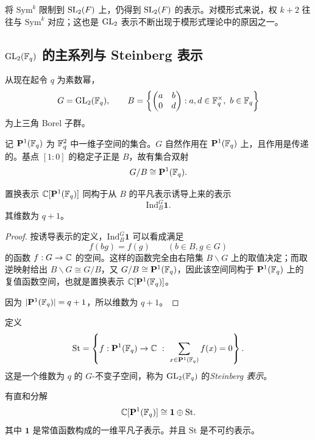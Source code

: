\begin{remark}
将 $\mathrm{Sym}^k$ 限制到 $\mathrm{SL}_2(F)$ 上，仍得到 $\mathrm{SL}_2(F)$ 的表示。对模形式来说，权 $k+2$ 往往与 $\mathrm{Sym}^k$ 对应；这也是 $\mathrm{GL}_2$ 表示不断出现于模形式理论中的原因之一。
\end{remark}

\subsection*{$\mathrm{GL}_2(\mathbb{F}_q)$ 的主系列与 Steinberg 表示}

从现在起令 $q$ 为素数幂，
\[
G=\mathrm{GL}_2(\mathbb{F}_q),
\qquad
B=\left\{\begin{pmatrix} a&b\\0&d \end{pmatrix}:a,d\in \mathbb{F}_q^{\times},\ b\in \mathbb{F}_q\right\}
\]
为上三角 Borel 子群。

记 $\mathbf{P}^1(\mathbb{F}_q)$ 为 $\mathbb{F}_q^2$ 中一维子空间的集合。$G$ 自然作用在 $\mathbf{P}^1(\mathbb{F}_q)$ 上，且作用是传递的。基点 $[1:0]$ 的稳定子正是 $B$，故有集合双射
\[
G/B\cong \mathbf{P}^1(\mathbb{F}_q).
\]

\begin{proposition}
置换表示 $\mathbb{C}[\mathbf{P}^1(\mathbb{F}_q)]$ 同构于从 $B$ 的平凡表示诱导上来的表示
\[
\mathrm{Ind}_B^G \mathbf{1}.
\]
其维数为 $q+1$。
\end{proposition}

\begin{proof}
按诱导表示的定义，$\mathrm{Ind}_B^G\mathbf{1}$ 可以看成满足
\[
 f(bg)=f(g)\qquad (b\in B,g\in G)
\]
的函数 $f:G\to \mathbb{C}$ 的空间。这样的函数完全由右陪集 $B\backslash G$ 上的取值决定；而取逆映射给出 $B\backslash G\cong G/B$，又 $G/B\cong \mathbf{P}^1(\mathbb{F}_q)$，因此该空间同构于 $\mathbf{P}^1(\mathbb{F}_q)$ 上的复值函数空间，也就是置换表示 $\mathbb{C}[\mathbf{P}^1(\mathbb{F}_q)]$。

因为 $|\mathbf{P}^1(\mathbb{F}_q)|=q+1$，所以维数为 $q+1$。
\end{proof}

\begin{definition}
定义
\[
\mathrm{St}=
\left\{f:\mathbf{P}^1(\mathbb{F}_q)\to \mathbb{C}\ :\ \sum_{x\in \mathbf{P}^1(\mathbb{F}_q)}f(x)=0\right\}.
\]
这是一个维数为 $q$ 的 $G$-不变子空间，称为 $\mathrm{GL}_2(\mathbb{F}_q)$ 的\emph{Steinberg 表示}。
\end{definition}

\begin{proposition}
有直和分解
\[
\mathbb{C}[\mathbf{P}^1(\mathbb{F}_q)]\cong \mathbf{1}\oplus \mathrm{St}.
\]
其中 $\mathbf{1}$ 是常值函数构成的一维平凡子表示。并且 $\mathrm{St}$ 是不可约表示。
\end{proposition}

